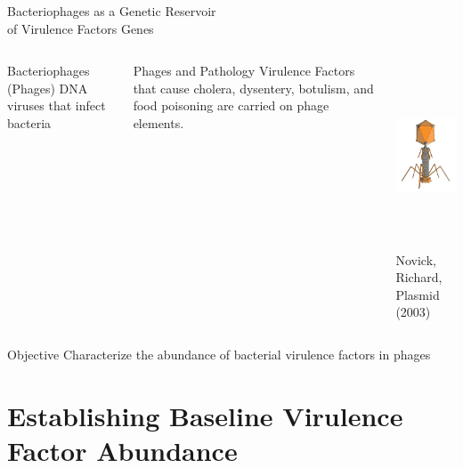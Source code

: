 \documentclass[11pt]{beamer}
\begin{document}
	
	\begin{frame}{Bacteriophages as a Genetic Reservoir \\ of Virulence Factors Genes}
	\begin{columns}
	\begin{block}{Bacteriophages (Phages)}
	DNA viruses that infect bacteria
	\end{block}
	
	
	\begin{block}{Phages and Pathology}
	Virulence Factors that cause cholera, dysentery, botulism, and food poisoning are carried on phage elements.
	\end{block}
	
	\includegraphics[height=5.5cm, width=5cm]{phage.png} \\
	\hspace{0.5cm}	
	\tiny{Novick, Richard, Plasmid (2003)}
	\end{columns}
	
	\begin{block}{Objective}
	Characterize the abundance of bacterial virulence factors in phages
	\end{block}
	
	\end{frame}

	
\section{Establishing Baseline Virulence Factor Abundance}
\subsection{}
\end{document}
